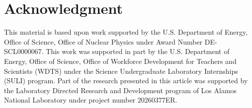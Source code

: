 \documentclass[pdftex,twocolumn,epjc3]{svjour3}          %
\begin{document}
\section*{Acknowledgment}
This material is based upon work supported by the U.S. Department of Energy, Office of Science, Office of Nuclear Physics under Award Number DE-SCL0000067. This work was supported in part by the U.S. Department of Energy, Office of Science, Office of Workforce Development for Teachers and Scientists (WDTS) under the Science Undergraduate Laboratory Internships (SULI) program. Part of the research presented in this article was supported by the Laboratory Directed Research and Development program of Los Alamos National Laboratory under project number 20260377ER.



% 
% 
% 
\end{document}
